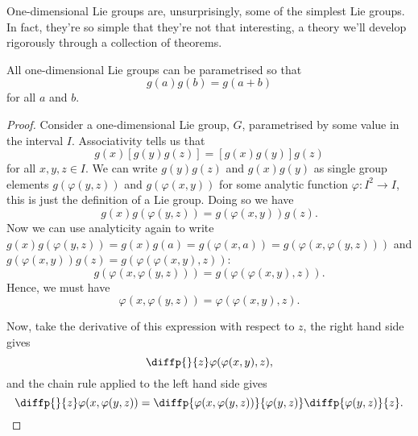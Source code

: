 \documentclass[fleqn]{NotesClass}
\begin{document}
    One-dimensional Lie groups are, unsurprisingly, some of the simplest Lie groups.
    In fact, they're so simple that they're not that interesting, a theory we'll develop rigorously through a collection of theorems.
    
    \begin{thm}{}{}
        All one-dimensional Lie groups can be parametrised so that
        \begin{equation}
            g(a) g(b) = g(a + b)
        \end{equation}
        for all \(a\) and \(b\).
        \begin{proof}
            Consider a one-dimensional Lie group, \(G\), parametrised by some value in the interval \(I\).
            Associativity tells us that
            \begin{equation}
                g(x) [g(y)g(z)] = [g(x)g(y)]g(z)
            \end{equation}
            for all \(x, y, z \in I\).
            We can write \(g(y)g(z)\) and \(g(x)g(y)\) as single group elements \(g(\varphi(y, z))\) and \(g(\varphi(x, y))\) for some analytic function \(\varphi \colon I^2 \to I\), this is just the definition of a Lie group.
            Doing so we have
            \begin{equation}
                g(x) g(\varphi(y, z)) = g(\varphi(x, y))g(z).
            \end{equation}
            Now we can use analyticity again to write \(g(x)g(\varphi(y, z)) = g(x)g(a) = g(\varphi(x, a)) = g(\varphi(x, \varphi(y, z)))\) and \(g(\varphi(x, y))g(z) = g(\varphi(\varphi(x, y), z))\):
            \begin{equation}
                g(\varphi(x, \varphi(y, z))) = g(\varphi(\varphi(x, y), z)).
            \end{equation}
            Hence, we must have
            \begin{equation}
                \varphi(x, \varphi(y, z)) = \varphi(\varphi(x, y), z).
            \end{equation}
            
            Now, take the derivative of this expression with respect to \(z\), the right hand side gives
            \begin{equation}
                \diffp{}{z}\varphi(\varphi(x, y), z),
            \end{equation}
            and the chain rule applied to the left hand side gives
            \begin{equation}
                \diffp{}{z} \varphi(x, \varphi(y, z)) = \diffp{\varphi(x, \varphi(y, z))}{{\varphi(y, z)}} \diffp{\varphi(y, z)}{z}.
            \end{equation}
            

\end{proof}
\end{thm}
\end{document}
